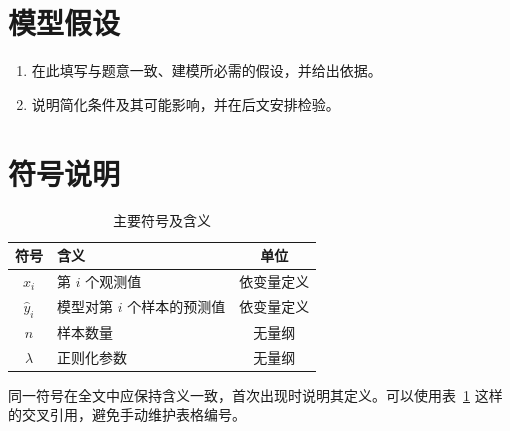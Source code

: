 \section{模型假设}
\begin{enumerate}
  \item 在此填写与题意一致、建模所必需的假设，并给出依据。
  \item 说明简化条件及其可能影响，并在后文安排检验。
\end{enumerate}

\section{符号说明}
\begin{table}[htbp]
  \centering
  \caption{主要符号及含义}\label{tab:symbols}
  \begin{tabularx}{.84\textwidth}{cXc}
    \toprule
    符号 & 含义 & 单位\\
    \midrule
    $x_i$ & 第 $i$ 个观测值 & 依变量定义\\
    $\hat y_i$ & 模型对第 $i$ 个样本的预测值 & 依变量定义\\
    $n$ & 样本数量 & 无量纲\\
    $\lambda$ & 正则化参数 & 无量纲\\
    \bottomrule
  \end{tabularx}
\end{table}

同一符号在全文中应保持含义一致，首次出现时说明其定义。可以使用表~\ref{tab:symbols} 这样的交叉引用，避免手动维护表格编号。
